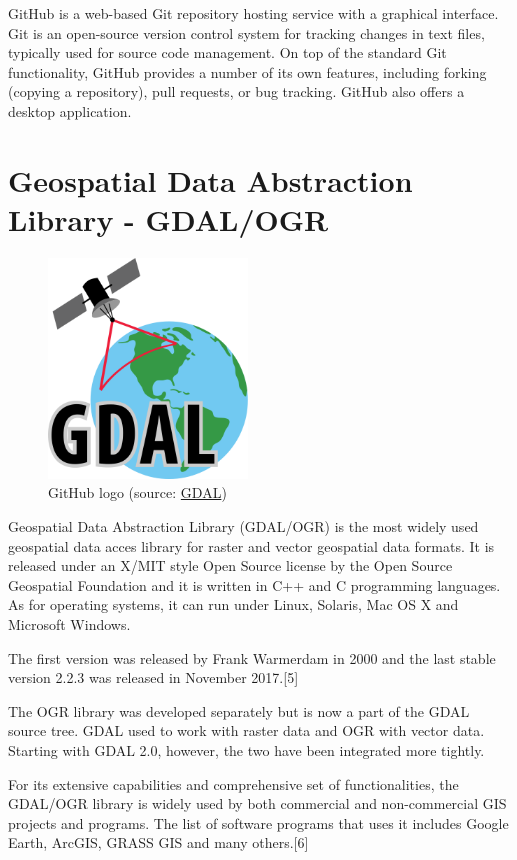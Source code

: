 GitHub is a web-based Git repository hosting service with a graphical interface. Git is an open-source version control system for tracking changes in text files, typically used for source code management. On top of the standard Git functionality, GitHub provides a number of its own features, including forking (copying a repository), pull requests, or bug tracking. GitHub also offers a desktop application.

\section{Geospatial Data Abstraction Library - GDAL/OGR}

\begin{figure}[H] \centering
      \includegraphics[width=150pt]{./pictures/gdal.png}
      \caption[GDAL logo]{GitHub logo (source:
\href{GitHub}{GDAL})}
      \label{fig:GDAL}
  \end{figure}

Geospatial Data Abstraction Library (GDAL/OGR) is the most widely used geospatial data acces library for raster and vector geospatial data formats. It is released under an X/MIT style Open Source license by the Open Source Geospatial Foundation and it is written in C++ and C programming languages. As for operating systems, it can run under Linux, Solaris, Mac OS X and Microsoft Windows. 

The first version was released by Frank Warmerdam in 2000 and the last stable version 2.2.3 was released in November 2017.[5]


The OGR library was developed separately but is now a part of the GDAL source tree. GDAL used to work with raster data and OGR with vector data. Starting with GDAL 2.0, however, the two have been integrated more tightly.

For its extensive capabilities and comprehensive set of functionalities, the GDAL/OGR library is widely used by both commercial and non-commercial GIS projects and programs. The list of software programs that uses it includes Google Earth, ArcGIS, GRASS GIS and many others.[6]


